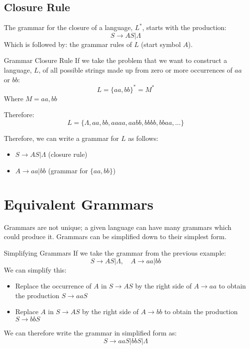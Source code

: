 \subsection{Closure Rule}
The grammar for the closure of a language, $L^*$, starts with the production:
\[S \rightarrow AS|\Lambda\]
Which is followed by: the grammar rules of $L$ (start symbol $A$).

\begin{example}{Grammar Closure Rule}
If we take the problem that we want to construct a language, $L$, of all possible strings made up from zero or more occurrences of $aa$ or $bb$:
\[L = \{aa, bb\}^* = M^*\]
Where $M = {aa, bb}$

Therefore:
\[L = \{\Lambda, aa, bb, aaaa, aabb, bbbb, bbaa, \ldots\}\]

Therefore, we can write a grammar for $L$ as follows:
\begin{itemize}
    \item $S \rightarrow AS | \Lambda$ (closure rule)
    \item $A \rightarrow aa|bb$ (grammar for $\{aa, bb\}$)
\end{itemize}
\end{example}

\section{Equivalent Grammars}
Grammars are not unique; a given language can have many grammars which could produce it. Grammars can be simplified down to their simplest form. 

\begin{example}{Simplifying Grammars}
If we take the grammar from the previous example:
\[S \rightarrow AS | \Lambda, \quad A \rightarrow aa|bb\]
We can simplify this:
\begin{itemize}
    \item Replace the occurrence of $A$ in $S \rightarrow AS$ by the right side of $A \rightarrow aa$ to obtain the production $S \rightarrow aaS$
    \item Replace $A$ in $S \rightarrow AS$ by the right side of $A \rightarrow bb$ to obtain the production $S \rightarrow bbS$
\end{itemize}
We can therefore write the grammar in simplified form as:
\[S \rightarrow aaS | bbS | \Lambda\]
\end{example}
